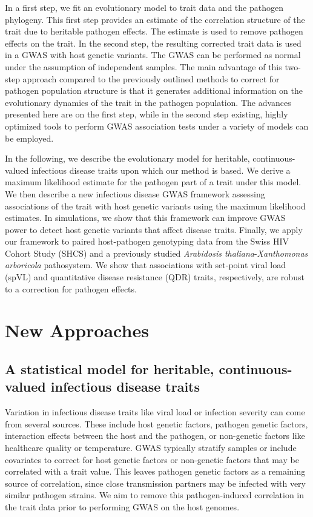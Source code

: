 \documentclass[11pt]{article}
\begin{document}
\begin{linenumbers}
In a first step, we fit an evolutionary model to trait data and the pathogen phylogeny. This first step provides an estimate of the correlation structure of the trait due to heritable pathogen effects. The estimate is used to remove pathogen effects on the trait. In the second step, the resulting corrected trait data is used in a GWAS with host genetic variants. The GWAS can be performed as normal under the assumption of independent samples. The main advantage of this two-step approach compared to the previously outlined methods to correct for pathogen population structure is that it generates additional information on the evolutionary dynamics of the trait in the pathogen population. The advances presented here are on the first step, while in the second step existing, highly optimized tools to perform GWAS association tests under a variety of models can be employed. 

In the following, we describe the evolutionary model for heritable, continuous-valued infectious disease traits upon which our method is based. We derive a maximum likelihood estimate for the pathogen part of a trait under this model. We then describe a new infectious disease GWAS framework assessing associations of the trait with host genetic variants using the maximum likelihood estimates. In simulations, we show that this framework can improve GWAS power to detect host genetic variants that affect disease traits. Finally, we apply our framework to paired host-pathogen genotyping data from the Swiss HIV Cohort Study (SHCS) and a previously studied \emph{Arabidosis thaliana}-\emph{Xanthomonas arboricola} pathosystem. We show that associations with set-point viral load (spVL) and quantitative disease resistance (QDR) traits, respectively, are robust to a correction for pathogen effects.

\section*{New Approaches}
\subsection*{A statistical model for heritable, continuous-valued infectious disease traits}

Variation in infectious disease traits like viral load or infection severity can come from several sources. These include host genetic factors, pathogen genetic factors, interaction effects between the host and the pathogen, or non-genetic factors like healthcare quality or temperature. GWAS typically stratify samples or include covariates to correct for host genetic factors or non-genetic factors that may be correlated with a trait value. This leaves pathogen genetic factors as a remaining source of correlation, since close transmission partners may be infected with very similar pathogen strains. We aim to remove this pathogen-induced correlation in the trait data prior to performing GWAS on the host genomes.



\end{linenumbers}
\end{document}
